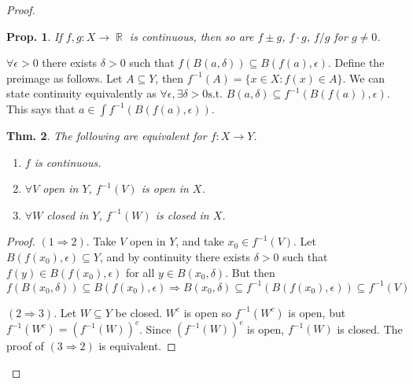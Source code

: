 \documentclass[12pt, a4paper]{book}
\DeclareMathOperator{\R}{\mathbb{R}}
\newcommand{\st}{\text{s.t. }}
\newtheorem{theorem}{Thm.}[section]
\newtheorem{proposition}[theorem]{Prop.}
\theoremstyle{nonumberplain}
\newtheorem{proof}{Proof}
\begin{document}
\begin{proof}
\begin{proposition}
    If $f,g:X\to\R$ is continuous, then so are $f\pm g$, $f\cdot g$, $f/g$ for $g\neq 0$.
\end{proposition}
$\forall\epsilon>0$ there exists $\delta>0$ such that $f(B(a,\delta))\subseteq B(f(a),\epsilon)$. Define the preimage
as follows. Let $A\subseteq Y$, then $f^{-1}(A)=\{x\in X:f(x)\in A\}$. We can state continuity equivalently as
$\forall\epsilon,\exists\delta>0\st B(a,\delta)\subseteq f^{-1}(B(f(a)),\epsilon)$. This says that $a\in\int f^{-1}(B(f(a),\epsilon))$.
\begin{theorem}
    The following are equivalent for $f:X\to Y$.
    \begin{enumerate}
        \item $f$ is continuous.
        \item $\forall V$ open in $Y$, $f^{-1}(V)$ is open in $X$.
        \item $\forall W$ closed in $Y$, $f^{-1}(W)$ is closed in $X$.
    \end{enumerate}
\end{theorem}
\begin{proof}
    $(1\Rightarrow 2)$. Take $V$ open in $Y$, and take $x_0\in f^{-1}(V)$. Let $B(f(x_0),\epsilon)\subseteq Y$, and
    by continuity there exists $\delta>0$ such that $f(y)\in B(f(x_0),\epsilon)$ for all $y\in B(x_0,\delta)$. But then
    $f(B(x_0,\delta))\subseteq B(f(x_0),\epsilon)\Rightarrow B(x_0,\delta)\subseteq f^{-1}(B(f(x_0),\epsilon))\subseteq f^{-1}(V)$

    $(2\Rightarrow 3)$. Let $W\subseteq Y$ be closed. $W^c$ is open so $f^{-1}(W^c)$ is open, but $f^{-1}(W^c)=(f^{-1}(W))^c$.
    Since $(f^{-1}(W))^c$ is open, $f^{-1}(W)$ is closed. The proof of $(3\Rightarrow 2)$ is equivalent.


\end{proof}
\end{proof}
\end{document}
